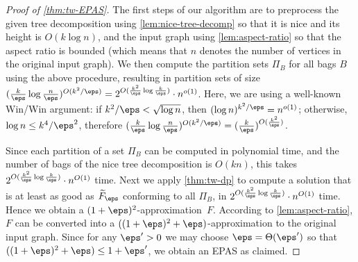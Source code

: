 \begin{proof}[Proof of \autoref{thm:tw-EPAS}]

The first steps of our algorithm are to preprocess the given tree decomposition
using \autoref{lem:nice-tree-decomp} so that it is nice and its height is
$O(k\log n)$, and the input graph using \autoref{lem:aspect-ratio} so that the
aspect ratio is bounded (which means that $n$ denotes the number of vertices in
the original input graph). We then compute the partition sets $\Pi_B$ for all
bags $B$ using the above procedure, resulting in partition sets of size
$(\frac{k}{\eps}\log
\frac{n}{\eps})^{O(k^2/\eps)}=2^{O(\frac{k^2}{\eps}\log\frac{k}{\eps})}\cdot
n^{o(1)}$. Here, we are using a well-known Win/Win argument: if
$k^2/\eps<\sqrt{\log n}$, then $(\log n)^{k^2/\eps} = n^{o(1)}$; otherwise,
$\log n\le k^4/\eps^2$, therefore  $(\frac{k}{\eps}\log
\frac{n}{\eps})^{O(k^2/\eps)}=(\frac{k}{\eps})^{O(\frac{k^2}{\eps})}$.


Since each partition of a set $\Pi_B$ can be computed in polynomial time, and
the number of bags of the nice tree decomposition is $O(kn)$, this takes
$2^{O(\frac{k^2}{\eps}\log\frac{k}{\eps})}\cdot n^{O(1)}$ time. Next we apply
\autoref{thm:tw-dp} to compute a solution that is at least as good as
$\widetilde{F}_\eps$ conforming to all $\Pi_B$, in
$2^{O(\frac{k^2}{\eps}\log\frac{k}{\eps})}\cdot n^{O(1)}$ time. Hence we obtain
a $(1+\eps)^2$-approximation~$F$. According to \autoref{lem:aspect-ratio}, $F$
can be converted into a $((1+\eps)^2+\eps)$-approximation to the original input
graph. Since for any $\eps'>0$ we may choose $\eps=\Theta(\eps')$ so that
$((1+\eps)^2+\eps)\leq 1+\eps'$, we obtain an EPAS as claimed.  \end{proof}

